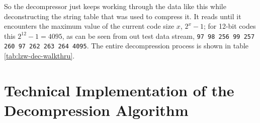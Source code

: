 \begin{refsection}
So the decompressor just keeps working through the data like this while
deconstructing the string table that was used to compress it. It reads
until it encounters the maximum value of the current code size $x$,
$2^{x}-1$; for 12-bit codes this $2^{12} - 1 = 4095$, as can be seen
from out test data stream, \texttt{97 98 256 99 257 260 97 262 263 264
  4095}. The entire decompression process is shown in table \ref{tab:lzw-dec-walkthru}.

\begin{table}
  \centering
  \noindent{}
  \caption{Detailed LZW decompression on the string \texttt{ababcbababaaaaaaa}.}
  \label{tab:lzw-dec-walkthru}
\end{table}

\section{Technical Implementation of the Decompression Algorithm}


\end{refsection}
